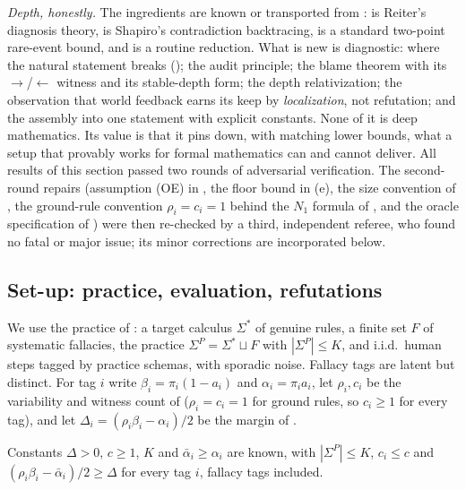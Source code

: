 \emph{Depth, honestly.} The ingredients are known or transported from :  is Reiter's diagnosis theory,  is Shapiro's contradiction backtracing,  is a standard two-point rare-event bound, and  is a routine reduction. What is new is diagnostic: where the natural statement breaks (); the audit principle; the blame theorem with its $\to$/$\leftarrow$ witness and its stable-depth form; the depth relativization; the observation that world feedback earns its keep by \emph{localization}, not refutation; and the assembly into one statement with explicit constants. None of it is deep mathematics. Its value is that it pins down, with matching lower bounds, what a setup that provably works for formal mathematics can and cannot deliver. All results of this section passed two rounds of adversarial verification. The second-round repairs (assumption (OE) in , the floor bound in (e), the size convention of , the ground-rule convention $\rho_i=c_i=1$ behind the $N_1$ formula of , and the oracle specification of ) were then re-checked by a third, independent referee, who found no fatal or major issue; its minor corrections are incorporated below.

\subsection{Set-up: practice, evaluation, refutations}\label{sec:twotier:setup}

We use the practice of : a target calculus $\Sigma^*$ of genuine rules, a finite set $F$ of systematic fallacies, the practice $\Sigma^P=\Sigma^*\sqcup F$ with $|\Sigma^P|\le K$, and i.i.d.\ human steps tagged by practice schemas, with sporadic noise. Fallacy tags are latent but distinct. For tag $i$ write $\beta_i=\pi_i(1-a_i)$ and $\alpha_i=\pi_ia_i$, let $\rho_i,c_i$ be the variability and witness count of  ($\rho_i=c_i=1$ for ground rules, so $c_i\ge1$ for every tag), and let $\Delta_i=(\rho_i\beta_i-\alpha_i)/2$ be the margin of .

\begin{assumption}[Floor]\label{asm:twotier:floor}
Constants $\Delta>0$, $c\ge1$, $K$ and $\bar\alpha_i\ge\alpha_i$ are known, with $|\Sigma^P|\le K$, $c_i\le c$ and $(\rho_i\beta_i-\bar\alpha_i)/2\ge\Delta$ for every tag $i$, fallacy tags included.
\end{assumption}

